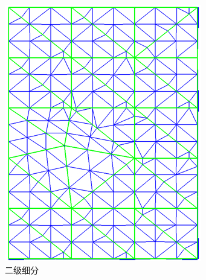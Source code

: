 \begin{figure}
\begin{fullwidth}
\begin{subfigure}[b]{0.245\thewidth}
		\includegraphics[width=1.\textwidth]{figures/r/hierarchical-triangulation-3}
		\caption{二级细分}
	\end{subfigure}
	\begin{subfigure}[b]{0.245\thewidth}

\end{subfigure}
\end{fullwidth}
\end{figure}

